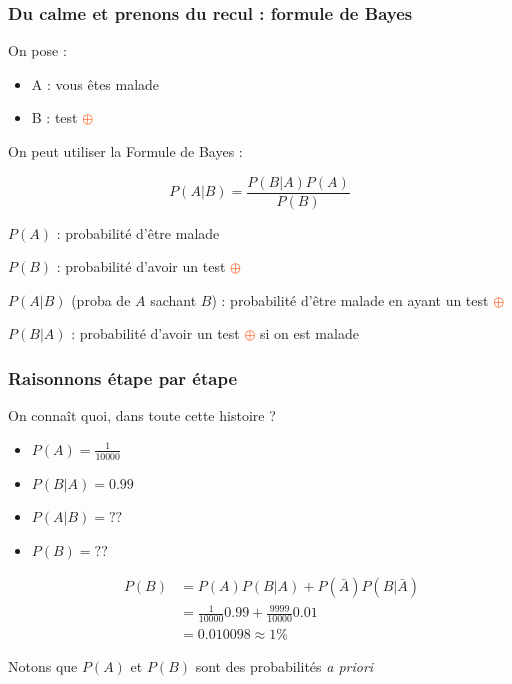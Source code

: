 \documentclass[usenames, dvipsnames, no-framenumber]{beamer}
\newcommand{\positif}{\textcolor{OrangeRed}{$\oplus$} }
\begin{document}
\begin{frame}%
\frametitle{Du calme et prenons du recul : formule de Bayes}

\pause

On pose :

\begin{itemize}
\item A : vous êtes malade
\item B : test \positif
\end{itemize}

\pause

On peut utiliser la \alert{Formule de Bayes} :

\[
P(A|B) = \frac{P(B|A)P(A)}{P(B)}
\]

\pause
$P(A)$ : probabilité d'être malade

$P(B)$ : probabilité d'avoir un test \positif\pause

$P(A|B)$ (proba de $A$ sachant $B$) : probabilité d'être malade en ayant un test \positif\pause

$P(B|A)$ : probabilité d'avoir un test \positif si on est malade %

\end{frame}

\begin{frame}%
\frametitle{Raisonnons étape par étape}

On connaît quoi, dans toute cette histoire ?

\begin{itemize}
\item $P(A) = \frac{1}{10000}$ \pause
\item $P(B|A) = 0.99$ \pause
\item $P(A|B) = ??$ \pause
\item $P(B) = ??$ \pause

\begin{align*}P(B) &= P(A)P(B|A) + P(\bar{A})P(B|\bar{A})\\
&=\frac{1}{10000}0.99 + \frac{9999}{10000}0.01\\
&= 0.010098 \approx 1\%\end{align*}

\end{itemize}

Notons que $P(A)$ et $P(B)$ sont des probabilités \textit{a priori}

\end{frame}
\end{document}
